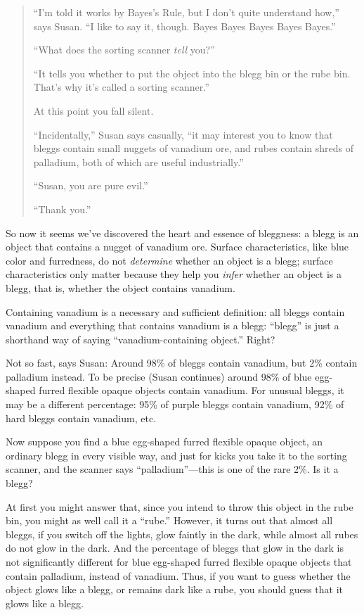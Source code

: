 \begin{quotation}
{
 ``I'm told it works by
Bayes's Rule, but I don't quite
understand how,'' says Susan. ``I
like to say it, though. Bayes Bayes Bayes Bayes
Bayes.''}

{
 ``What does the sorting scanner \textit{tell}
you?''}

{
 ``It tells you whether to put the object into the
blegg bin or the rube bin. That's why
it's called a sorting scanner.''}

{
 At this point you fall silent.}

{
 ``Incidentally,'' Susan says
casually, ``it may interest you to know that bleggs
contain small nuggets of vanadium ore, and rubes contain shreds of
palladium, both of which are useful industrially.''}

{
 ``Susan, you are pure evil.''}

{
  ``Thank you.''}
\end{quotation}

{
 So now it seems we've discovered the heart and
essence of bleggness: a blegg is an object that contains a nugget of
vanadium ore. Surface characteristics, like blue color and furredness,
do not \textit{determine} whether an object is a blegg; surface
characteristics only matter because they help you \textit{infer}
whether an object is a blegg, that is, whether the object contains
vanadium.}

{
 Containing vanadium is a necessary and sufficient definition: all
bleggs contain vanadium and everything that contains vanadium is a
blegg: ``blegg'' is just a shorthand
way of saying ``vanadium-containing
object.'' Right?}

{
 Not so fast, says Susan: Around 98\% of bleggs contain vanadium,
but 2\% contain palladium instead. To be precise (Susan continues)
around 98\% of blue egg-shaped furred flexible opaque objects contain
vanadium. For unusual bleggs, it may be a different percentage: 95\% of
purple bleggs contain vanadium, 92\% of hard bleggs contain vanadium,
etc.}

{
 Now suppose you find a blue egg-shaped furred flexible opaque
object, an ordinary blegg in every visible way, and just for kicks you
take it to the sorting scanner, and the scanner says
``palladium''---this is one of the
rare 2\%. Is it a blegg?}

{
 At first you might answer that, since you intend to throw this
object in the rube bin, you might as well call it a
``rube.'' However, it turns out that
almost all bleggs, if you switch off the lights, glow faintly in the
dark, while almost all rubes do not glow in the dark. And the
percentage of bleggs that glow in the dark is not significantly
different for blue egg-shaped furred flexible opaque objects that
contain palladium, instead of vanadium. Thus, if you want to guess
whether the object glows like a blegg, or remains dark like a rube, you
should guess that it glows like a blegg.}

